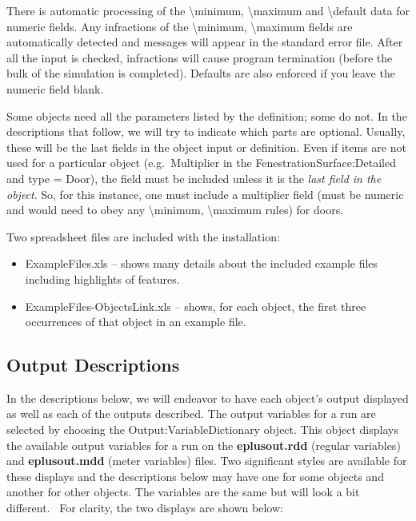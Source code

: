 There is automatic processing of the \textbackslash{}minimum, \textbackslash{}maximum and \textbackslash{}default data for numeric fields. Any infractions of the \textbackslash{}minimum, \textbackslash{}maximum fields are automatically detected and messages will appear in the standard error file. After all the input is checked, infractions will cause program termination (before the bulk of the simulation is completed). Defaults are also enforced if you leave the numeric field blank.

Some objects need all the parameters listed by the definition; some do not. In the descriptions that follow, we will try to indicate which parts are optional. Usually, these will be the last fields in the object input or definition. Even if items are not used for a particular object (e.g.~Multiplier in the FenestrationSurface:Detailed and type = Door), the field must be included unless it is the \emph{last field in the object}. So, for this instance, one must include a multiplier field (must be numeric and would need to obey any \textbackslash{}minimum, \textbackslash{}maximum rules) for doors.

Two spreadsheet files are included with the installation:

\begin{itemize}
\item
  ExampleFiles.xls -- shows many details about the included example files including highlights of features.
\item
  ExampleFiles-ObjectsLink.xls -- shows, for each object, the first three occurrences of that object in an example file.
\end{itemize}

\subsection{Output Descriptions}\label{output-descriptions}

In the descriptions below, we will endeavor to have each object's output displayed as well as each of the outputs described. The output variables for a run are selected by choosing the Output:VariableDictionary object. This object displays the available output variables for a run on the \textbf{eplusout.rdd} (regular variables) and \textbf{eplusout.mdd} (meter variables) files. Two significant styles are available for these displays and the descriptions below may have one for some objects and another for other objects. The variables are the same but will look a bit different.~ For clarity, the two displays are shown below:

